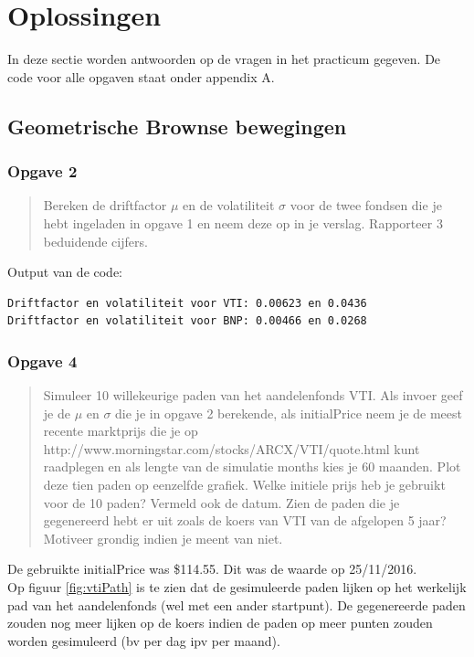 \documentclass[11pt, a4paper, titlepage, openright]{article}
\begin{document}

\tableofcontents
\newpage

\section{Oplossingen}
	In deze sectie worden antwoorden op de vragen in het practicum gegeven. De code voor alle opgaven staat onder appendix A.

	\subsection{Geometrische Brownse bewegingen}

	\subsubsection{Opgave 2}
		\begin{quote}
			Bereken de driftfactor \( \mu \) en de volatiliteit \( \sigma \) voor de twee fondsen die je hebt ingeladen in opgave 1 en
			neem deze op in je verslag. Rapporteer 3 beduidende cijfers.
		\end{quote}

		\noindent Output van de code:
\begin{lstlisting}
Driftfactor en volatiliteit voor VTI: 0.00623 en 0.0436
Driftfactor en volatiliteit voor BNP: 0.00466 en 0.0268\end{lstlisting}


	\subsubsection{Opgave 4}
		\begin{quote}
			Simuleer 10 willekeurige paden van het aandelenfonds VTI. Als invoer geef je de \( \mu \) en \( \sigma \)
			die je in opgave 2 berekende, als initialPrice neem je de meest recente marktprijs die je op
			http://www.morningstar.com/stocks/ARCX/VTI/quote.html kunt raadplegen en als lengte van de simulatie
			months kies je 60 maanden. Plot deze tien paden op eenzelfde grafiek. Welke initiele prijs heb je
			gebruikt voor de 10 paden? Vermeld ook de datum. Zien de paden die je gegenereerd hebt er uit
			zoals de koers van VTI van de afgelopen 5 jaar? Motiveer grondig indien je meent van niet.
		\end{quote}

		\noindent De gebruikte initialPrice was \$114.55. Dit was de waarde op 25/11/2016. \\
		Op figuur \ref{fig:vtiPath} is te zien dat de gesimuleerde paden lijken op het werkelijk pad van het aandelenfonds (wel met een ander startpunt).
		De gegenereerde paden zouden nog meer lijken op de koers indien de paden op meer punten zouden worden gesimuleerd (bv per dag ipv per maand).
\end{document}

